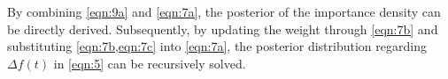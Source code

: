 \documentclass[lettersize,journal]{IEEEtran}
\begin{document}
By combining \eqref{eqn:9a} and \eqref{eqn:7a}, the posterior of the importance density can be directly derived. Subsequently, by updating the weight through \eqref{eqn:7b} and
substituting \cref{eqn:7b,eqn:7c} into \eqref{eqn:7a}, the posterior distribution regarding \(\varDelta f(t)\) in \eqref{eqn:5} can be recursively solved.


\end{document}
